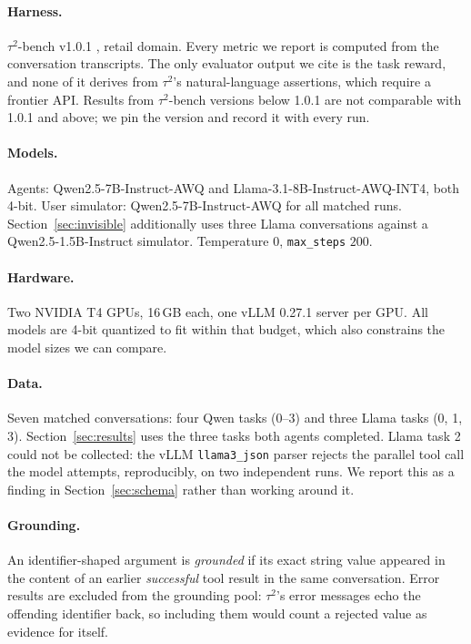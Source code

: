\documentclass{article}
\begin{document}
\paragraph{Harness.} $\tau^2$-bench v1.0.1 \citep{barres2025tau2}, retail domain. Every metric we report is computed from the conversation transcripts. The only evaluator output we cite is the task reward, and none of it derives from $\tau^2$'s natural-language assertions, which require a frontier API. Results from $\tau^2$-bench versions below 1.0.1 are not comparable with 1.0.1 and above; we pin the version and record it with every run.

\paragraph{Models.} Agents: Qwen2.5-7B-Instruct-AWQ and Llama-3.1-8B-Instruct-AWQ-INT4, both 4-bit. User simulator: Qwen2.5-7B-Instruct-AWQ for all matched runs. Section~\ref{sec:invisible} additionally uses three Llama conversations against a Qwen2.5-1.5B-Instruct simulator. Temperature $0$, \texttt{max\_steps} $200$.

\paragraph{Hardware.} Two NVIDIA T4 GPUs, 16\,GB each, one vLLM 0.27.1 server per GPU. All models are 4-bit quantized to fit within that budget, which also constrains the model sizes we can compare.

\paragraph{Data.} Seven matched conversations: four Qwen tasks (0--3) and three Llama tasks (0, 1, 3). Section~\ref{sec:results} uses the three tasks both agents completed. Llama task 2 could not be collected: the vLLM \texttt{llama3\_json} parser rejects the parallel tool call the model attempts, reproducibly, on two independent runs. We report this as a finding in Section~\ref{sec:schema} rather than working around it.

\paragraph{Grounding.} An identifier-shaped argument is \emph{grounded} if its exact string value appeared in the content of an earlier \emph{successful} tool result in the same conversation. Error results are excluded from the grounding pool: $\tau^2$'s error messages echo the offending identifier back, so including them would count a rejected value as evidence for itself.
\end{document}
